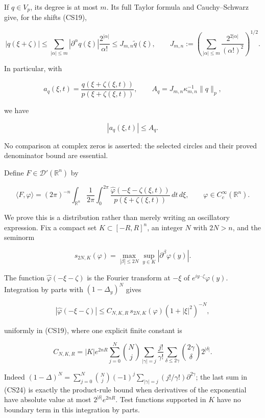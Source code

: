 \documentclass[
  11pt,
]{article}
\begin{document}
If \(q\in V_p\), its degree is at most \(m\). Its full Taylor formula
and Cauchy--Schwarz give, for the shifts (CS19),

\[
 |q(\xi+\zeta)|
 \leq\sum_{|\alpha|\leq m}
           |\partial^\alpha q(\xi)|\frac{2^{|\alpha|}}{\alpha!}
 \leq J_{m,n}\widetilde q(\xi),
 \qquad
 J_{m,n}:=\left(\sum_{|\alpha|\leq m}
                         \frac{2^{2|\alpha|}}{(\alpha!)^2}\right)^{1/2}.
                                                                    \tag{CS20}
\]

In particular, with

\[
 a_q(\xi,t)=\frac{q(\xi+\zeta(\xi,t))}{p(\xi+\zeta(\xi,t))},
 \qquad A_q=J_{m,n}\kappa_{m,n}^{-1}\|q\|_p,
\]

we have

\[
 |a_q(\xi,t)|\leq A_q.                                       \tag{CS21}
\]

No comparison at complex zeros is asserted: the selected circles and
their proved denominator bound are essential.

Define \(F\in\mathcal D'(\mathbb R^n)\) by

\[
 \langle F,\varphi\rangle
 =(2\pi)^{-n}\int_{\mathbb R^n}\frac1{2\pi}\int_0^{2\pi}
       \frac{\widehat\varphi(-\xi-\zeta(\xi,t))}
            {p(\xi+\zeta(\xi,t))}\,dt\,d\xi,
 \qquad \varphi\in C_c^\infty(\mathbb R^n).                    \tag{CS22}
\]

We prove this is a distribution rather than merely writing an
oscillatory expression. Fix a compact set \(K\subset[-R,R]^n\), an
integer \(N\) with \(2N>n\), and the seminorm

\[
 s_{2N,K}(\varphi)=\max_{|\beta|\leq2N}\sup_{y\in K}
                                      |\partial^\beta\varphi(y)|.
\]

The function \(\widehat\varphi(-\xi-\zeta)\) is the Fourier transform at
\(-\xi\) of \(e^{iy\cdot\zeta}\varphi(y)\). Integration by parts with
\((1-\Delta_y)^N\) gives

\[
 |\widehat\varphi(-\xi-\zeta)|
       \leq C_{N,K,R}\,s_{2N,K}(\varphi)(1+|\xi|^2)^{-N},       \tag{CS23}
\]

uniformly in (CS19), where one explicit finite constant is

\[
 C_{N,K,R}=|K|e^{2nR}
   \sum_{j=0}^N\binom Nj\sum_{|\gamma|=j}\frac{j!}{\gamma!}
          \sum_{\delta\leq2\gamma}\binom{2\gamma}{\delta}2^{|\delta|}.
                                                                    \tag{CS24}
\]

Indeed \((1-\Delta)^N=\sum_{j=0}^N\binom Nj(-1)^j
\sum_{|\gamma|=j}(j!/\gamma!)\partial^{2\gamma}\); the last sum in
(CS24) is exactly the product-rule bound when derivatives of the
exponential have absolute value at most \(2^{|\delta|}e^{2nR}\). Test
functions supported in \(K\) have no boundary term in this integration
by parts.
\end{document}
